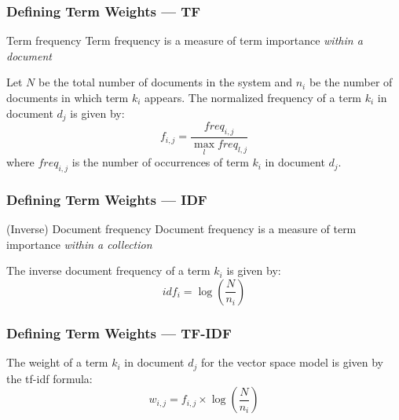 \documentclass[svgnames]{beamer}
\begin{document}

\begin{frame} \frametitle{Defining Term Weights --- TF}

  \begin{block}{Term frequency}
    Term frequency is a measure of term importance \emph{within a document}
  \end{block}

  \begin{definition}
    Let $N$ be the total number of documents in the system and $n_i$ be the
    number of documents in which term $k_i$ appears. The \alert{normalized
      frequency} of a term $k_i$ in document $d_j$ is given by:
    \begin{displaymath}
      f_{i,j} = \frac{freq_{i,j}}{\max_l freq_{l,j}}
    \end{displaymath}
    where $freq_{i,j}$ is the number of occurrences of term $k_i$ in document
    $d_j$.
  \end{definition}

\end{frame}


\begin{frame} \frametitle{Defining Term Weights --- IDF}

  \begin{block}{(Inverse) Document frequency}
    Document frequency is a measure of term importance \emph{within a
      collection}
  \end{block}

  \begin{definition}
    The \alert{inverse document frequency} of a term $k_i$ is given by:
    \begin{displaymath}
      idf_i = \log \left( \frac{N}{n_i} \right)
    \end{displaymath}
  \end{definition}

\end{frame}


\begin{frame}
  \frametitle{Defining Term Weights --- TF-IDF}

  \begin{definition}
    The weight of a term $k_i$ in document $d_j$ for the vector space model is
    given by the \alert{tf-idf} formula:
    \begin{displaymath}
      w_{i,j} = f_{i,j} \times \log \left( \frac{N}{n_i} \right)
    \end{displaymath}
  \end{definition}

\end{frame}
\end{document}
